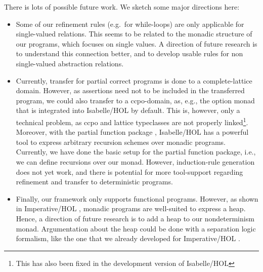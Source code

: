 \documentclass[11pt,a4paper]{book}
\begin{document}
There is lots of possible future work. We sketch some major directions here:
\begin{itemize}
\item
Some of our refinement rules (e.g.\ for while-loops) are only applicable for
single-valued relations. This seems to be related to the monadic structure of
our programs, which focuses on single values. A direction of future research is
to understand this connection better, and to develop usable rules for 
non single-valued abstraction relations.
\item
Currently, transfer for partial correct programs is done to a complete-lattice
domain. However, as assertions need not to be included in the transferred program,
we could also transfer to a ccpo-domain, as, e.g., the option monad that is 
integrated into Isabelle/HOL by default. This is, however, only a technical 
problem, as ccpo and lattice typeclasses are not properly 
linked\footnote{This has also been fixed in the development version of 
Isabelle/HOL}.
Moreover, with the partial function package \cite{Kr10}, 
Isabelle/HOL has a powerful tool to express arbitrary recursion schemes over 
monadic programs. Currently, we have done the basic setup for the partial 
function package, i.e., we can define recursions over our monad. However, 
induction-rule generation does not yet work, and there is potential for more 
tool-support regarding refinement and transfer to deterministic programs.
\item
Finally, our framework only supports functional programs. However, as shown in
Imperative/HOL \cite{BKHEM08}, monadic programs are well-suited to 
express a heap. Hence, a direction of future research is to add a heap to our
nondeterminism monad. Argumentation about the heap could be done with a 
separation logic \cite{Rey02} formalism, like the one that we already 
developed for Imperative/HOL \cite{Meis2011}.
\end{itemize}



\end{document}

